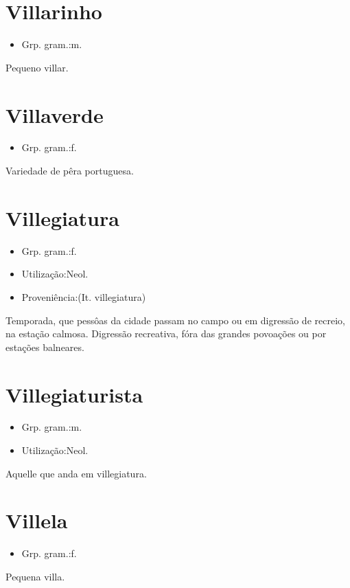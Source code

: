 \documentclass{article}
\begin{document}
\section{Villarinho}
\begin{itemize}
\item {Grp. gram.:m.}
\end{itemize}
Pequeno villar.
\section{Villaverde}
\begin{itemize}
\item {Grp. gram.:f.}
\end{itemize}
Variedade de pêra portuguesa.
\section{Villegiatura}
\begin{itemize}
\item {Grp. gram.:f.}
\end{itemize}
\begin{itemize}
\item {Utilização:Neol.}
\end{itemize}
\begin{itemize}
\item {Proveniência:(It. \textunderscore villegiatura\textunderscore )}
\end{itemize}
Temporada, que pessôas da cidade passam no campo ou em digressão de recreio, na estação calmosa.
Digressão recreativa, fóra das grandes povoações ou por estações balneares.
\section{Villegiaturista}
\begin{itemize}
\item {Grp. gram.:m.}
\end{itemize}
\begin{itemize}
\item {Utilização:Neol.}
\end{itemize}
Aquelle que anda em villegiatura.
\section{Villela}
\begin{itemize}
\item {Grp. gram.:f.}
\end{itemize}
Pequena villa.
\end{document}
